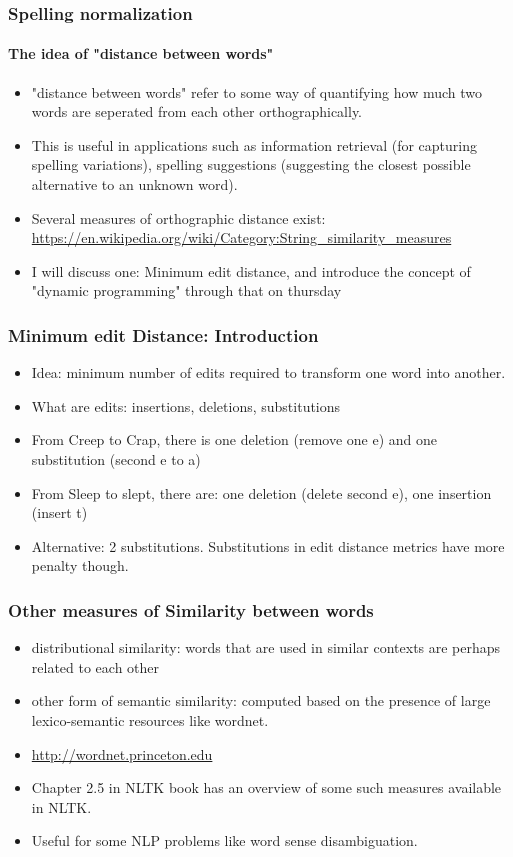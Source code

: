 \documentclass{beamer}
\begin{document}
\begin{frame}
\frametitle{Spelling normalization}
\framesubtitle{The idea of "distance between words"}
\begin{itemize}
\item "distance between words" refer to some way of quantifying how much two words are seperated from each other orthographically.
\item This is useful in applications such as information retrieval (for capturing spelling variations), spelling suggestions (suggesting the closest possible alternative to an unknown word).
\item Several measures of orthographic distance exist: \url{https://en.wikipedia.org/wiki/Category:String_similarity_measures}
\item I will discuss one: Minimum edit distance, and introduce the concept of "dynamic programming" through that on thursday
\end{itemize}
\end{frame}

\begin{frame}
\frametitle{Minimum edit Distance: Introduction}
\begin{itemize}
\item Idea: minimum number of edits required to transform one word into another.
\item What are edits: insertions, deletions, substitutions
\item From Creep to Crap, there is one deletion (remove one e) and one substitution (second e to a)
\item From Sleep to slept, there are: one deletion (delete second e), one insertion (insert t) \pause
\item Alternative: 2 substitutions. Substitutions in edit distance metrics have more penalty though. 
\end{itemize}
\end{frame}

\begin{frame}
\frametitle{Other measures of Similarity between words}
\begin{itemize}
\item distributional similarity: words that are used in similar contexts are perhaps related to each other
\item other form of semantic similarity: computed based on the presence of large lexico-semantic resources like wordnet.
\item \url{http://wordnet.princeton.edu}
\item Chapter 2.5 in NLTK book has an overview of some such measures available in NLTK.
\item Useful for some NLP problems like word sense disambiguation.
\end{itemize}
\end{frame}
\end{document}
